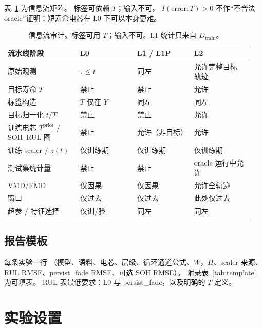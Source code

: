 \documentclass[UTF8,a4paper,12pt]{ctexart}
\begin{document}
表~\ref{tab:provenance} 为信息流矩阵。
标签可依赖 $T$；输入不可。
$I(\mathrm{error};T)>0$ 不作``不合法 oracle''证明：短寿命电芯在 L0 下可以本身更难。

\begin{table}[htbp]
\centering
\caption{信息流审计。标签可用 $T$；输入不可。L1 统计只来自 $D_{\mathrm{train}}$。}
\label{tab:provenance}
\begin{tabular}{@{}p{0.28\linewidth}p{0.22\linewidth}p{0.22\linewidth}p{0.22\linewidth}@{}}
\toprule
流水线阶段 & L0 & L1 / L1P & L2 \\
\midrule
原始观测 & $\tau\le t$ & 同左 & 允许完整目标轨迹 \\
目标寿命 $T$ & 禁止 & 禁止 & 允许 \\
标签构造 & $T$ 仅在 $Y$ & 同左 & 同左 \\
目标归一化 $t/T$ & 禁止 & 禁止 & 允许 \\
训练电芯 $T^{\mathrm{prior}}$ / SOH--RUL 图 & 禁止 & 允许（非目标） & 允许 \\
训练 scaler / $z(t)$ & 仅训练期 & 仅训练期 & 仅训练期 \\
测试集统计量 & 禁止 & 禁止 & oracle 运行中允许 \\
VMD/EMD & 仅因果 & 仅因果 & 允许全轨迹 \\
窗口 & 仅过去 & 仅过去 & 此处仅过去 \\
超参 / 特征选择 & 仅训/验 & 同左 & 同左 \\
\bottomrule
\end{tabular}
\end{table}

\subsection{报告模板}
\label{sec:template}

每条实验一行
（模型、语料、电芯、层级、循环通道公式、$W$，$H$、scaler 来源、RUL RMSE、persist\_fade RMSE、可选 SOH RMSE）。
附录表~\ref{tab:template} 为可填表。
RUL 表最低要求：L0 与 persist\_fade，以及明确的 $T$ 定义。

\section{实验设置}
\label{sec:setup}
\end{document}
